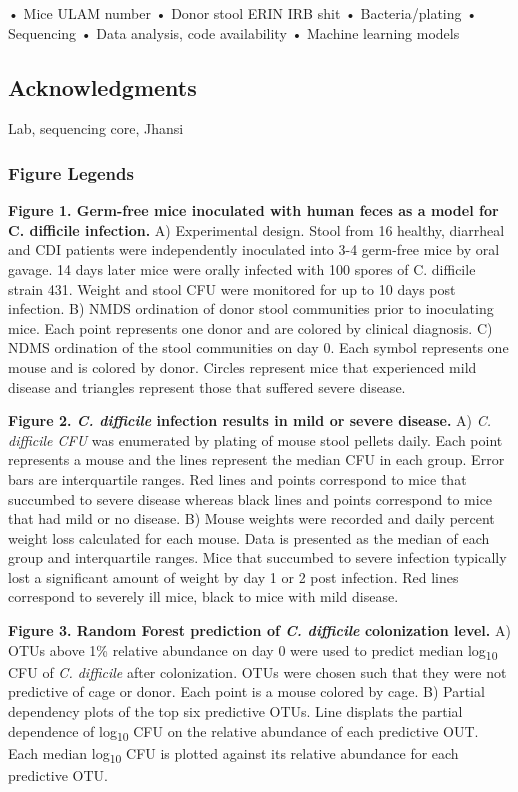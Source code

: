\documentclass[11pt,]{article}
\begin{document}
• Mice ULAM number • Donor stool ERIN IRB shit • Bacteria/plating •
Sequencing • Data analysis, code availability • Machine learning models

\subsection{Acknowledgments}\label{acknowledgments}

Lab, sequencing core, Jhansi

\newpage

\subsubsection{Figure Legends}\label{figure-legends}

\textbf{Figure 1. Germ-free mice inoculated with human feces as a model
for C. difficile infection.} A) Experimental design. Stool from 16
healthy, diarrheal and CDI patients were independently inoculated into
3-4 germ-free mice by oral gavage. 14 days later mice were orally
infected with 100 spores of C. difficile strain 431. Weight and stool
CFU were monitored for up to 10 days post infection. B) NMDS ordination
of donor stool communities prior to inoculating mice. Each point
represents one donor and are colored by clinical diagnosis. C) NDMS
ordination of the stool communities on day 0. Each symbol represents one
mouse and is colored by donor. Circles represent mice that experienced
mild disease and triangles represent those that suffered severe disease.

\textbf{Figure 2. \emph{C. difficile} infection results in mild or
severe disease.} A) \emph{C. difficile CFU} was enumerated by plating of
mouse stool pellets daily. Each point represents a mouse and the lines
represent the median CFU in each group. Error bars are interquartile
ranges. Red lines and points correspond to mice that succumbed to severe
disease whereas black lines and points correspond to mice that had mild
or no disease. B) Mouse weights were recorded and daily percent weight
loss calculated for each mouse. Data is presented as the median of each
group and interquartile ranges. Mice that succumbed to severe infection
typically lost a significant amount of weight by day 1 or 2 post
infection. Red lines correspond to severely ill mice, black to mice with
mild disease.

\textbf{Figure 3. Random Forest prediction of \emph{C. difficile}
colonization level.} A) OTUs above 1\% relative abundance on day 0 were
used to predict median log\textsubscript{10} CFU of \emph{C. difficile}
after colonization. OTUs were chosen such that they were not predictive
of cage or donor. Each point is a mouse colored by cage. B) Partial
dependency plots of the top six predictive OTUs. Line displats the
partial dependence of log\textsubscript{10} CFU on the relative
abundance of each predictive OUT. Each median log\textsubscript{10} CFU
is plotted against its relative abundance for each predictive OTU.
\end{document}
